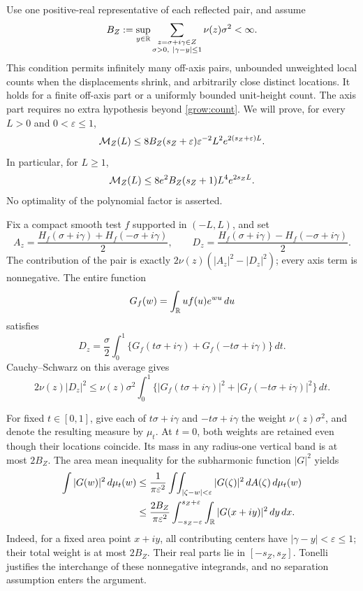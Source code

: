 Use one positive-real representative of each reflected pair, and assume
\begin{equation}\label{grow:weighted-density}
 B_Z:=\sup_{y\in\mathbb R}
 \sum_{\substack{z=\sigma+i\gamma\in Z\\
                  \sigma>0,\ |\gamma-y|\le1}}
          \nu(z)\sigma^2<\infty.
\end{equation}
This condition permits infinitely many off-axis pairs, unbounded
unweighted local counts when the displacements shrink, and arbitrarily
close distinct locations. It holds for a finite off-axis part or a
uniformly bounded unit-height count. The axis part requires no extra
hypothesis beyond \eqref{grow:count}. We will prove, for every
\(L>0\) and \(0<\varepsilon\le1\),
\begin{equation}\label{grow:epsilon-upper}
 \mathcal M_Z(L)\le
 8B_Z(s_Z+\varepsilon)\varepsilon^{-2}L^2
                   e^{2(s_Z+\varepsilon)L}.
\end{equation}
In particular, for \(L\ge1\),
\begin{equation}\label{grow:upper}
 \mathcal M_Z(L)\le8e^2B_Z(s_Z+1)L^4e^{2s_ZL}.
\end{equation}
No optimality of the polynomial factor is asserted.

Fix a compact smooth test \(f\) supported in \((-L,L)\), and set
\[
 A_z=\frac{H_f(\sigma+i\gamma)+H_f(-\sigma+i\gamma)}2,
 \qquad
 D_z=\frac{H_f(\sigma+i\gamma)-H_f(-\sigma+i\gamma)}2.
\]
The contribution of the pair is exactly
\(2\nu(z)(|A_z|^2-|D_z|^2)\); every axis term is
nonnegative. The entire function
\[
 G_f(w)=\int_\mathbb R u f(u)e^{wu}\,du
\]
satisfies
\[
 D_z=\frac\sigma2\int_0^1
     \{G_f(t\sigma+i\gamma)+G_f(-t\sigma+i\gamma)\}\,dt.
\]
Cauchy--Schwarz on this average gives
\begin{equation}\label{grow:pair-bound}
 2\nu(z)|D_z|^2\le\nu(z)\sigma^2\int_0^1
       \{|G_f(t\sigma+i\gamma)|^2+
          |G_f(-t\sigma+i\gamma)|^2\}\,dt.
\end{equation}

For fixed \(t\in[0,1]\), give each of \(t\sigma+i\gamma\)
and \(-t\sigma+i\gamma\) the weight \(\nu(z)\sigma^2\), and
denote the resulting measure by \(\mu_t\). At \(t=0\), both
weights are retained even though their locations coincide. Its mass
in any radius-one vertical band is at most \(2B_Z\). The area
mean inequality for the subharmonic function \(|G|^2\) yields
\begin{equation}\label{grow:area-mean}
 \begin{split}
 \int |G(w)|^2\,d\mu_t(w)
 &\le\frac1{\pi\varepsilon^2}
    \int\!\!\int_{|\zeta-w|<\varepsilon}
               |G(\zeta)|^2\,dA(\zeta)\,d\mu_t(w)\\
 &\le\frac{2B_Z}{\pi\varepsilon^2}
    \int_{-s_Z-\varepsilon}^{s_Z+\varepsilon}
    \int_\mathbb R |G(x+iy)|^2\,dy\,dx.
 \end{split}
\end{equation}
Indeed, for a fixed area point \(x+iy\), all contributing centers
have \(|\gamma-y|<\varepsilon\le1\); their total weight is at
most \(2B_Z\). Their real parts lie in \([-s_Z,s_Z]\).
Tonelli justifies the interchange of these nonnegative integrands,
and no separation assumption enters the argument.

